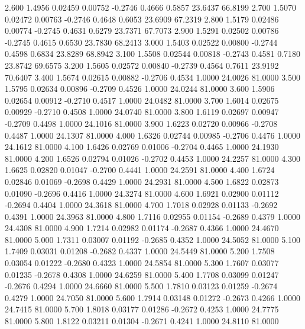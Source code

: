    2.600   1.4956   0.02459   0.00752  -0.2746   0.4666   0.5857  23.6437  66.8199
   2.700   1.5070   0.02472   0.00763  -0.2746   0.4648   0.6053  23.6909  67.2319
   2.800   1.5179   0.02486   0.00774  -0.2745   0.4631   0.6279  23.7371  67.7073
   2.900   1.5291   0.02502   0.00786  -0.2745   0.4615   0.6530  23.7830  68.2413
   3.000   1.5403   0.02522   0.00800  -0.2744   0.4598   0.6834  23.8289  68.8942
   3.100   1.5508   0.02544   0.00818  -0.2743   0.4581   0.7180  23.8742  69.6575
   3.200   1.5605   0.02572   0.00840  -0.2739   0.4564   0.7611  23.9192  70.6407
   3.400   1.5674   0.02615   0.00882  -0.2706   0.4534   1.0000  24.0026  81.0000
   3.500   1.5795   0.02634   0.00896  -0.2709   0.4526   1.0000  24.0244  81.0000
   3.600   1.5906   0.02654   0.00912  -0.2710   0.4517   1.0000  24.0482  81.0000
   3.700   1.6014   0.02675   0.00929  -0.2710   0.4508   1.0000  24.0740  81.0000
   3.800   1.6119   0.02697   0.00947  -0.2709   0.4498   1.0000  24.1016  81.0000
   3.900   1.6223   0.02720   0.00966  -0.2708   0.4487   1.0000  24.1307  81.0000
   4.000   1.6326   0.02744   0.00985  -0.2706   0.4476   1.0000  24.1612  81.0000
   4.100   1.6426   0.02769   0.01006  -0.2704   0.4465   1.0000  24.1930  81.0000
   4.200   1.6526   0.02794   0.01026  -0.2702   0.4453   1.0000  24.2257  81.0000
   4.300   1.6625   0.02820   0.01047  -0.2700   0.4441   1.0000  24.2591  81.0000
   4.400   1.6724   0.02846   0.01069  -0.2698   0.4429   1.0000  24.2931  81.0000
   4.500   1.6822   0.02873   0.01090  -0.2696   0.4416   1.0000  24.3274  81.0000
   4.600   1.6921   0.02900   0.01112  -0.2694   0.4404   1.0000  24.3618  81.0000
   4.700   1.7018   0.02928   0.01133  -0.2692   0.4391   1.0000  24.3963  81.0000
   4.800   1.7116   0.02955   0.01154  -0.2689   0.4379   1.0000  24.4308  81.0000
   4.900   1.7214   0.02982   0.01174  -0.2687   0.4366   1.0000  24.4670  81.0000
   5.000   1.7311   0.03007   0.01192  -0.2685   0.4352   1.0000  24.5052  81.0000
   5.100   1.7409   0.03031   0.01208  -0.2682   0.4337   1.0000  24.5449  81.0000
   5.200   1.7508   0.03054   0.01222  -0.2680   0.4323   1.0000  24.5854  81.0000
   5.300   1.7607   0.03077   0.01235  -0.2678   0.4308   1.0000  24.6259  81.0000
   5.400   1.7708   0.03099   0.01247  -0.2676   0.4294   1.0000  24.6660  81.0000
   5.500   1.7810   0.03123   0.01259  -0.2674   0.4279   1.0000  24.7050  81.0000
   5.600   1.7914   0.03148   0.01272  -0.2673   0.4266   1.0000  24.7415  81.0000
   5.700   1.8018   0.03177   0.01286  -0.2672   0.4253   1.0000  24.7775  81.0000
   5.800   1.8122   0.03211   0.01304  -0.2671   0.4241   1.0000  24.8110  81.0000
